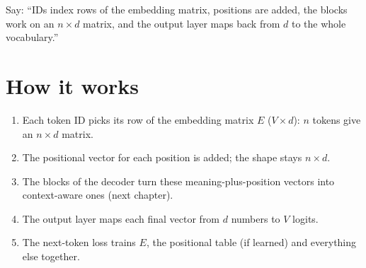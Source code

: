 \begin{sayit}
\begin{pic}
\end{pic}
Say: ``IDs index rows of the embedding matrix, positions are added, the blocks work on an $n \times d$ matrix, and the output layer maps back from $d$ to the whole vocabulary.''
\end{sayit}

\section{How it works}
\begin{enumerate}
  \item Each token ID picks its row of the embedding matrix $E$ ($V \times d$): $n$ tokens give an $n \times d$ matrix.
  \item The positional vector for each position is added; the shape stays $n \times d$.
  \item The blocks of the decoder turn these meaning-plus-position vectors into context-aware ones (next chapter).
  \item The output layer maps each final vector from $d$ numbers to $V$ logits.
  \item The next-token loss trains $E$, the positional table (if learned) and everything else together.
\end{enumerate}

